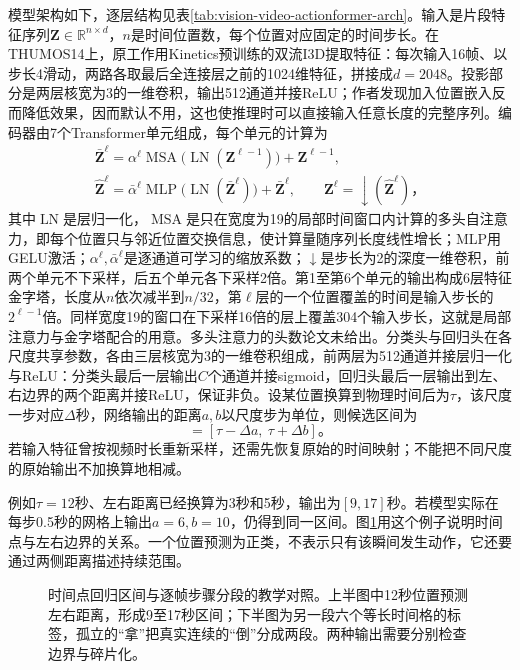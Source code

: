 模型架构如下，逐层结构见表\ref{tab:vision-video-actionformer-arch}。输入是片段特征序列$\bm{Z}\in\mathbb{R}^{n\times d}$，$n$是时间位置数，每个位置对应固定的时间步长。在THUMOS14上，原工作用Kinetics预训练的双流I3D提取特征：每次输入16帧、以步长4滑动，两路各取最后全连接层之前的1024维特征，拼接成$d=2048$。投影部分是两层核宽为3的一维卷积，输出512通道并接ReLU；作者发现加入位置嵌入反而降低效果，因而默认不用，这也使推理时可以直接输入任意长度的完整序列。编码器由7个Transformer单元组成，每个单元的计算为
\[
  \begin{gathered}
  \bar{\bm{Z}}^{\ell}=\alpha^{\ell}\operatorname{MSA}\bigl(\operatorname{LN}(\bm{Z}^{\ell-1})\bigr)+\bm{Z}^{\ell-1},\\
  \widehat{\bm{Z}}^{\ell}=\bar{\alpha}^{\ell}\operatorname{MLP}\bigl(\operatorname{LN}(\bar{\bm{Z}}^{\ell})\bigr)+\bar{\bm{Z}}^{\ell},\qquad
  \bm{Z}^{\ell}=\operatorname{\downarrow}(\widehat{\bm{Z}}^{\ell})\text{，}
  \end{gathered}
\]
其中$\operatorname{LN}$是层归一化，$\operatorname{MSA}$是只在宽度为19的局部时间窗口内计算的多头自注意力，即每个位置只与邻近位置交换信息，使计算量随序列长度线性增长；MLP用GELU激活；$\alpha^{\ell},\bar{\alpha}^{\ell}$是逐通道可学习的缩放系数；$\downarrow$是步长为2的深度一维卷积，前两个单元不下采样，后五个单元各下采样2倍。第1至第6个单元的输出构成6层特征金字塔，长度从$n$依次减半到$n/32$，第$\ell$层的一个位置覆盖的时间是输入步长的$2^{\ell-1}$倍。同样宽度19的窗口在下采样16倍的层上覆盖304个输入步长，这就是局部注意力与金字塔配合的用意。多头注意力的头数论文未给出。分类头与回归头在各尺度共享参数，各由三层核宽为3的一维卷积组成，前两层为512通道并接层归一化与ReLU：分类头最后一层输出$C$个通道并接sigmoid，回归头最后一层输出到左、右边界的两个距离并接ReLU，保证非负。设某位置换算到物理时间后为$\tau$，该尺度一步对应$\Delta$秒，网络输出的距离$a,b$以尺度步为单位，则候选区间为
\begin{equation}
  [\widehat{\tau}_{\mathrm{s}},\widehat{\tau}_{\mathrm{e}}]
  =[\tau-\Delta a,\ \tau+\Delta b]\text{。}
  \label{eq:vision-video-boundaries}
\end{equation}
若输入特征曾按视频时长重新采样，还需先恢复原始的时间映射；不能把不同尺度的原始输出不加换算地相减。

例如$\tau=12$秒、左右距离已经换算为3秒和5秒，输出为$[9,17]$秒。若模型实际在每步0.5秒的网格上输出$a=6,b=10$，仍得到同一区间。图\ref{fig:vision-temporal-boundaries}用这个例子说明时间点与左右边界的关系。一个位置预测为正类，不表示只有该瞬间发生动作，它还要通过两侧距离描述持续范围。

\begin{figure}[htbp]
  \centering
  
  \caption{时间点回归区间与逐帧步骤分段的教学对照。上半图中12秒位置预测左右距离，形成9至17秒区间；下半图为另一段六个等长时间格的标签，孤立的“拿”把真实连续的“倒”分成两段。两种输出需要分别检查边界与碎片化。}
  \label{fig:vision-temporal-boundaries}
\end{figure}

